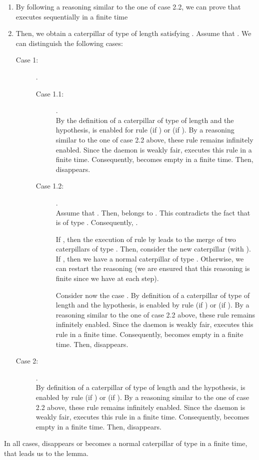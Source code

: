 \documentclass[11pt]{article}
\newenvironment{proof}{{\noindent\bf Proof. } }{{\hfill }}
\begin{document}
\begin{proof}
\begin{enumerate}
\begin{description}
\end{description}

\item By following a reasoning similar to the one of case 2.2, we can prove that  executes  sequentially in a finite time
\item Then, we obtain a caterpillar of type  of length  satisfying . Assume that . We can distinguish the following cases:

\begin{description}
\item [Case 1:] .

\begin{description}
\item [Case 1.1:]  .\\
By the definition of a caterpillar of type  of length  and the hypothesis,  is enabled for rule  (if ) or  (if ). By a reasoning similar to the one of case 2.2 above, these rule remains infinitely enabled. Since the daemon is weakly fair,  executes this rule in a finite time. Consequently,  becomes empty in a finite time. Then,  disappears.
\item [Case 1.2:] .\\
Assume that . Then,  belongs to . This contradicts the fact that  is of type . Consequently, . 

If , then the execution of rule  by  leads to the merge of two caterpillars of type . Then, consider the new caterpillar   (with ). If , then we have a normal caterpillar of type . Otherwise, we can restart the reasoning (we are ensured that this reasoning is finite since we have  at each step).

Consider now the case . By definition of a caterpillar of type  of length  and the hypothesis,  is enabled by rule  (if ) or  (if ). By a reasoning similar to the one of case 2.2 above, these rule remains infinitely enabled. Since the daemon is weakly fair,  executes this rule in a finite time. Consequently,  becomes empty in a finite time. Then,  disappears.
\end{description}

\item [Case 2:] .\\
By definition of a caterpillar of type  of length  and the hypothesis,  is enabled by rule  (if ) or  (if ). By a reasoning similar to the one of case 2.2 above, these rule remains infinitely enabled. Since the daemon is weakly fair,  executes this rule in a finite time. Consequently,  becomes empty in a finite time. Then,  disappears.
\end{description}

\end{enumerate}

In all cases,  disappears or becomes a normal caterpillar of type  in a finite time, that leads us to the lemma.
\end{proof}
\end{document}
